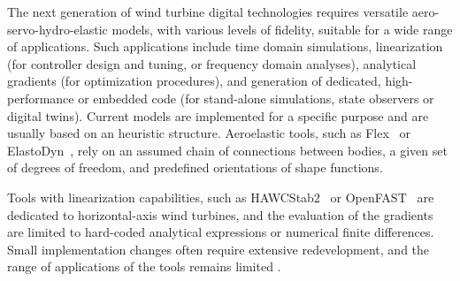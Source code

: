 \documentclass[wes, manuscript]{copernicus}
\renewcommand{\v}[1]{\boldsymbol{#1}}
\begin{document}


\introduction 

The next generation of wind turbine digital technologies requires versatile aero-servo-hydro-elastic
models, with various levels of fidelity, suitable for a wide range of applications. 
Such applications include time domain simulations, linearization (for controller design and tuning, or frequency domain analyses), analytical gradients (for optimization procedures), and generation of dedicated, high-performance or embedded code (for stand-alone simulations, state observers or digital twins). 
Current models are implemented for a specific purpose and are usually based on an heuristic structure.
Aeroelastic tools, such as Flex~\citep{flexoye,branlard:2019flex} or ElastoDyn~\citep{OpenFAST}, rely on an assumed chain of connections between bodies, a given set of degrees of freedom, and predefined orientations of shape functions. 


Tools with linearization capabilities, such as HAWCStab2~\citep{Sonderby:2014} or OpenFAST~\citep{OpenFAST} are dedicated to horizontal-axis wind turbines, and the evaluation of the gradients are limited to hard-coded analytical expressions or numerical finite differences. 
Small implementation changes often require extensive redevelopment, and the range of applications of the tools remains limited \citep{Simani:2015}.
\end{document}
